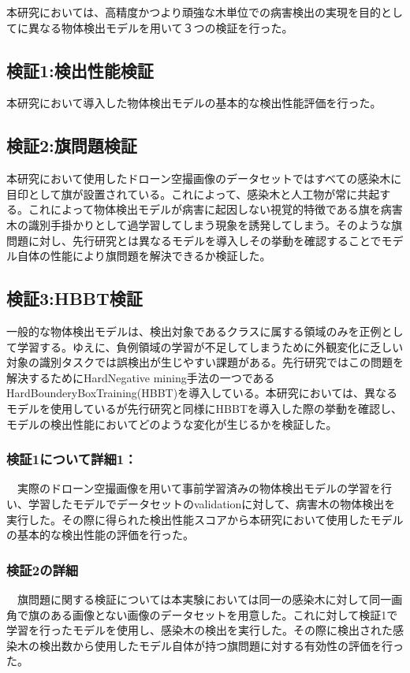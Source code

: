 本研究においては、高精度かつより頑強な木単位での病害検出の実現を目的としてに異なる物体検出モデルを用いて３つの検証を行った。
\subsection{検証1:検出性能検証}
 本研究において導入した物体検出モデルの基本的な検出性能評価を行った。
\subsection{検証2:旗問題検証}
本研究において使用したドローン空撮画像のデータセットではすべての感染木に目印として旗が設置されている。これによって、感染木と人工物が常に共起する。これによって物体検出モデルが病害に起因しない視覚的特徴である旗を病害木の識別手掛かりとして過学習してしまう現象を誘発してしまう。そのような旗問題に対し、先行研究とは異なるモデルを導入しその挙動を確認することでモデル自体の性能により旗問題を解決できるか検証した。

\subsection{検証3:HBBT検証}
一般的な物体検出モデルは、検出対象であるクラスに属する領域のみを正例として学習する。ゆえに、負例領域の学習が不足してしまうために外観変化に乏しい対象の識別タスクでは誤検出が生じやすい課題がある。先行研究ではこの問題を解決するためにHardNegative mining手法の一つであるHardBounderyBoxTraining(HBBT)を導入している。本研究においては、異なるモデルを使用しているが先行研究と同様にHBBTを導入した際の挙動を確認し、モデルの検出性能においてどのような変化が生じるかを検証した。


\subsubsection{検証1について詳細1：}
　実際のドローン空撮画像を用いて事前学習済みの物体検出モデルの学習を行い、学習したモデルでデータセットのvalidationに対して、病害木の物体検出を実行した。その際に得られた検出性能スコアから本研究において使用したモデルの基本的な検出性能の評価を行った。
 
\subsubsection{検証2の詳細}
　旗問題に関する検証については本実験においては同一の感染木に対して同一画角で旗のある画像とない画像のデータセットを用意した。これに対して検証1で学習を行ったモデルを使用し、感染木の検出を実行した。その際に検出された感染木の検出数から使用したモデル自体が持つ旗問題に対する有効性の評価を行った。
 
